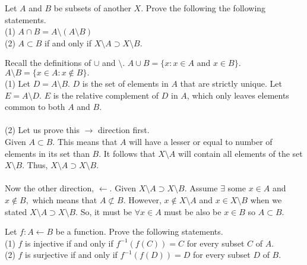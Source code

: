 \documentclass[12pt,letterpaper,boxed]{hmcpset}
\begin{document}

\begin{problem}[Exercise 1.7.]
Let $A$ and $B$ be subsets of another $X$. Prove the following the following statements. \\
(1) $A \cap B = A \setminus(A\setminus B)$\\
(2) $A \subset B$ if and only if $X\setminus A \supset X\setminus B.$
\end{problem}


\begin{solution}
Recall the definitions of $\cup$ and $\setminus$. $ A \cup B = \{x: x \in A$ and $x \in B\}$. $A\setminus B = \{ x \in A: x \notin B\}.$\\
(1) Let $D = A \setminus B.$ $D$ is the set of elements in $A$ that are strictly unique. Let $E = A \setminus D.$ $E$ is the relative complement of $D$ in $A$, which only leaves elements common to both $A$ and $B$. \\ \\
(2) Let us prove this $\rightarrow$ direction first. \\
Given $A \subset B.$ This means that $A$ will have a lesser or equal to number of elements in its set than $B.$ It follows that $X\setminus A$ will contain all elements of the set $X\setminus B.$ Thus, $X\setminus A \supset X\setminus B.$ \\
\\
Now the other direction, $\leftarrow$. Given $X\setminus A \supset X\setminus B.$ Assume $\exists$ some $x \in A$ and $x \notin B,$ which means that $A \not\subset B$. However, $x \notin X\setminus A$ and $x \in X\setminus B$ when we stated $X\setminus A \supset X\setminus B.$ So, it must be $\forall x \in A$ must be also be $x \in B$ so $A \subset B$.
\end{solution}

\begin{problem}[Exercise 3.3.]
Let $f: A \leftarrow B$ be a function. Prove the following statements. \\
(1) $f$ is injective if and only if $f^{-1}(f(C)) = C$ for every subset $C$ of $A$.\\
(2) $f$ is surjective if and only if $f^{-1}(f(D)) = D$ for every subset $D$ of $B$.
\end{problem}
\end{document}
